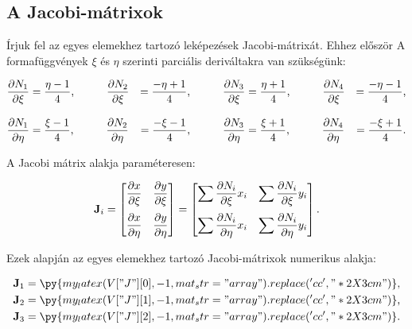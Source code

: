 
\subsection{A Jacobi-mátrixok}

Írjuk fel az egyes elemekhez tartozó leképezések Jacobi-mátrixát. Ehhez először
A formafüggvények $\xi$ és $\eta$ szerinti parciális deriváltakra van szükségünk:
\begin{myframe}
  \begin{alignat}{9}
    \pdv{N_1}{\xi}  & = \frac{\eta - 1}{4}
    \text, \qquad \quad
    \pdv{N_2}{\xi}  & = \frac{-\eta + 1}{4}
    \text, \qquad \quad
    \pdv{N_3}{\xi}  & = \frac{\eta + 1}{4}
    \text, \qquad \quad
    \pdv{N_4}{\xi}  & = \frac{-\eta - 1}{4}
    \text,                                  \\[3mm]
    \pdv{N_1}{\eta} & = \frac{\xi - 1}{4}
    \text, \qquad \quad
    \pdv{N_2}{\eta} & = \frac{-\xi - 1}{4}
    \text, \qquad \quad
    \pdv{N_3}{\eta} & = \frac{\xi + 1}{4}
    \text, \qquad \quad
    \pdv{N_4}{\eta} & = \frac{-\xi + 1}{4}
    \text.
  \end{alignat}
\end{myframe}
A Jacobi mátrix alakja paraméteresen:
\begin{myframe}
  \begin{equation}
    \mathbf{J}_i = \begin{bmatrix}
      \displaystyle \pdv{x}{\xi}  &
      \displaystyle \pdv{y}{\xi}    \\[4mm]
      \displaystyle \pdv{x}{\eta} &
      \displaystyle \pdv{y}{\eta}   \\
    \end{bmatrix} = \begin{bmatrix}
      \displaystyle \sum \pdv{N_i}{\xi} x_i  &
      \displaystyle \sum \pdv{N_i}{\xi} y_i    \\[4mm]
      \displaystyle \sum \pdv{N_i}{\eta} x_i &
      \displaystyle \sum \pdv{N_i}{\eta} y_i   \\
    \end{bmatrix}
    \text.
  \end{equation}
\end{myframe}
Ezek alapján az egyes elemekhez tartozó Jacobi-mátrixok numerikus alakja:
\begin{myframe}
  \begin{align}
    \rmat J_1 & =
    \py{my_latex(V["J"][0], -1, mat_str="array").replace('cc', "*{2}{X{3cm}}")}
    \text,
    \\
    \rmat J_2 & =
    \py{my_latex(V["J"][1], -1, mat_str="array").replace('cc', "*{2}{X{3cm}}")}
    \text,
    \\
    \rmat J_3 & =
    \py{my_latex(V["J"][2], -1, mat_str="array").replace('cc', "*{2}{X{3cm}}")}
    \text.
  \end{align}
\end{myframe}
